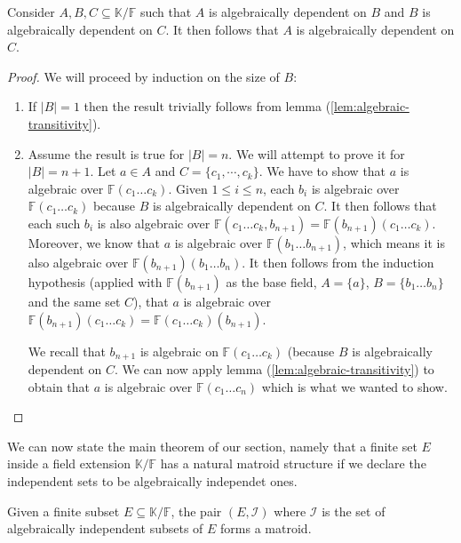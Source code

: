 \begin{lemma}\label{lem:algebraic-dependence-transitivity}
	Consider $A, B, C \subseteq \mathbb K / \mathbb{F} $ such that $A$ is algebraically dependent on $B$ and $B$ is algebraically dependent on $C$. It then follows that $A$ is algebraically dependent on $C$.
\end{lemma}

\begin{proof}
	We will proceed by induction on the size of $B$:
	\begin{enumerate}
		\item If $|B| = 1$ then the result trivially follows from lemma (\ref{lem:algebraic-transitivity}).
		\item Assume the result is true for $|B| = n$. We will attempt to prove it for $|B| = n + 1$. Let $a \in A$ and $C = \{c_1, \cdots, c_k\}$. We have to show that $a$ is algebraic over $\mathbb{F}(c _1 \ldots c _k )$. Given $1 \leq i \leq n$, each $b _i$ is algebraic over $\mathbb{F}(c _1 \ldots c _k )$ because $B$ is algebraically dependent on $C$. It then follows that each such $b _i $ is also algebraic over $\mathbb{F}(c _1 \ldots c _k, b _{n + 1}) = \mathbb{F} (b _{n + 1} )(c _1 \ldots c _k )$. Moreover, we know that $a$ is algebraic over $\mathbb{F} (b _1 \ldots b _{n + 1})$, which means it is also algebraic over $\mathbb{F} (b _{n + 1})(b _1 \ldots b _n )$. It then follows from the induction hypothesis (applied with $\mathbb{F} (b _{n + 1})$ as the base field, $A = \{a\}$, $B = \{b _1 \ldots b _n \}$ and the same set $C$), that $a$ is algebraic over $\mathbb{F} (b _{n + 1})(c _1 \ldots c _k ) = \mathbb{F} (c _1 \ldots c _k )(b _{n + 1})$.

		      We recall that $b _{n + 1}$ is algebraic on $\mathbb{F} (c _1 \ldots c _k )$ (because $B$ is algebraically dependent on $C$. We can now apply lemma (\ref{lem:algebraic-transitivity}) to obtain that $a$ is algebraic over $\mathbb{F} (c _1 \ldots c _n)$ which is what we wanted to show.
	\end{enumerate}
\end{proof}

We can now state the main theorem of our section, namely that a finite set $E$ inside a field extension $\mathbb{K}/\mathbb{F}$ has a natural matroid structure if we declare the independent sets to be algebraically independet ones.

\begin{theorem}\label{thm:algebraic-matroids-are-matroids}
	Given a finite subset $E \subseteq \mathbb K / \mathbb F$, the pair $(E, \mathcal I)$  where $\mathcal I$ is the set of algebraically independent subsets of $E$ forms a matroid.
\end{theorem}

